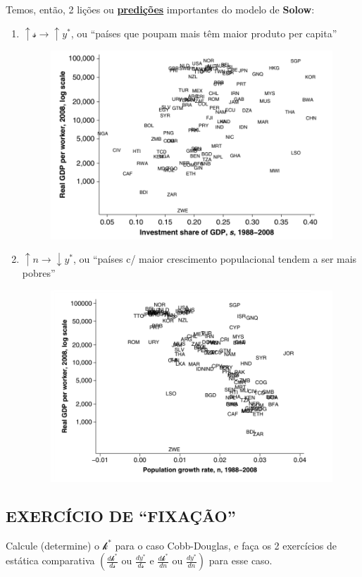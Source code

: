 \documentclass[a4paper,12pt]{article}[abntex2]
\begin{document}
Temos, então, 2 lições ou \textbf{\underline{predições}} importantes do modelo de \textbf{Solow}:

\begin{enumerate}
    \item\( \uparrow \mathcal{s} \rightarrow \uparrow y^* \), ou ``países que poupam mais têm maior produto per capita''
    \begin{figure}[H]
        \centering
        \includegraphics[width=0.7\linewidth]{Imagens/a7i3.png}
    \end{figure}
        
    \item\( \uparrow n \rightarrow \downarrow y^* \), ou ``países c/ maior crescimento populacional tendem a ser mais pobres''
    \begin{figure}[H]
        \centering
        \includegraphics[width=0.7\linewidth]{Imagens/a7i4.png}
    \end{figure}
\end{enumerate}

\subsection{\textbf{EXERCÍCIO DE ``FIXAÇÃO''}}

Calcule (determine) o \( \mathcal{k}^* \) para o caso Cobb-Douglas, e faça os 2 exercícios de estática comparativa 
\(\left( \frac{d\mathcal{k}^*}{d\mathcal{s}} \text{ ou } \frac{dy^*}{d\mathcal{s}} \text{ e } \frac{d\mathcal{k}^*}{dn} \text{ ou } \frac{dy^*}{dn} \right)\) para esse caso.
\end{document}
